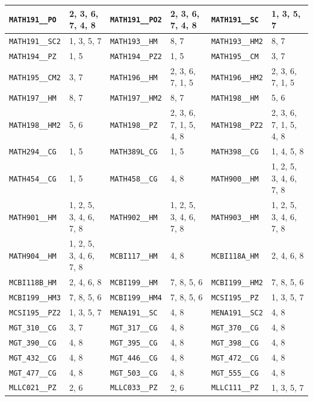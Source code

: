 \begin{longtable}{|l|l||l|l||l|l|}
    \verb|MATH191__PO| & 2, 3, 6, 7, 4, 8 & \verb|MATH191__PO2| & 2, 3, 6, 7, 4, 8 & \verb|MATH191__SC| & 1, 3, 5, 7\\\hline
    \verb|MATH191__SC2| & 1, 3, 5, 7 & \verb|MATH193__HM| & 8, 7 & \verb|MATH193__HM2| & 8, 7\\\hline
    \verb|MATH194__PZ| & 1, 5 & \verb|MATH194__PZ2| & 1, 5 & \verb|MATH195__CM| & 3, 7\\\hline
    \verb|MATH195__CM2| & 3, 7 & \verb|MATH196__HM| & 2, 3, 6, 7, 1, 5 & \verb|MATH196__HM2| & 2, 3, 6, 7, 1, 5\\\hline
    \verb|MATH197__HM| & 8, 7 & \verb|MATH197__HM2| & 8, 7 & \verb|MATH198__HM| & 5, 6\\\hline
    \verb|MATH198__HM2| & 5, 6 & \verb|MATH198__PZ| & 2, 3, 6, 7, 1, 5, 4, 8 & \verb|MATH198__PZ2| & 2, 3, 6, 7, 1, 5, 4, 8\\\hline
    \verb|MATH294__CG| & 1, 5 & \verb|MATH389L_CG| & 1, 5 & \verb|MATH398__CG| & 1, 4, 5, 8\\\hline
    \verb|MATH454__CG| & 1, 5 & \verb|MATH458__CG| & 4, 8 & \verb|MATH900__HM| & 1, 2, 5, 3, 4, 6, 7, 8\\\hline
    \verb|MATH901__HM| & 1, 2, 5, 3, 4, 6, 7, 8 & \verb|MATH902__HM| & 1, 2, 5, 3, 4, 6, 7, 8 & \verb|MATH903__HM| & 1, 2, 5, 3, 4, 6, 7, 8\\\hline
    \verb|MATH904__HM| & 1, 2, 5, 3, 4, 6, 7, 8 & \verb|MCBI117__HM| & 4, 8 & \verb|MCBI118A_HM| & 2, 4, 6, 8\\\hline
    \verb|MCBI118B_HM| & 2, 4, 6, 8 & \verb|MCBI199__HM| & 7, 8, 5, 6 & \verb|MCBI199__HM2| & 7, 8, 5, 6\\\hline
    \verb|MCBI199__HM3| & 7, 8, 5, 6 & \verb|MCBI199__HM4| & 7, 8, 5, 6 & \verb|MCSI195__PZ| & 1, 3, 5, 7\\\hline
    \verb|MCSI195__PZ2| & 1, 3, 5, 7 & \verb|MENA191__SC| & 4, 8 & \verb|MENA191__SC2| & 4, 8\\\hline
    \verb|MGT_310__CG| & 3, 7 & \verb|MGT_317__CG| & 4, 8 & \verb|MGT_370__CG| & 4, 8\\\hline
    \verb|MGT_390__CG| & 4, 8 & \verb|MGT_395__CG| & 4, 8 & \verb|MGT_398__CG| & 4, 8\\\hline
    \verb|MGT_432__CG| & 4, 8 & \verb|MGT_446__CG| & 4, 8 & \verb|MGT_472__CG| & 4, 8\\\hline
    \verb|MGT_477__CG| & 4, 8 & \verb|MGT_503__CG| & 4, 8 & \verb|MGT_555__CG| & 4, 8\\\hline
    \verb|MLLC021__PZ| & 2, 6 & \verb|MLLC033__PZ| & 2, 6 & \verb|MLLC111__PZ| & 1, 3, 5, 7\\\hline

\end{longtable}
